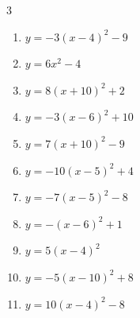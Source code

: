 \begin{multicols}{3}
\begin{enumerate}
  \item $\displaystyle y=-3\left( x-4\right)^{2}-9$

        \phantom{$\displaystyle 頂点\left( 4 , -9 \right)$}

\columnbreak %

\resetques

  \item $\displaystyle y=6x^{2}-4$

        \phantom{$\displaystyle 頂点\left( 0 , -4 \right)$}

  \item $\displaystyle y=8\left( x+10\right)^{2}+2$

        \phantom{$\displaystyle 頂点\left( -10 , 2 \right)$}

  \item $\displaystyle y=-3\left( x-6\right)^{2}+10$

        \phantom{$\displaystyle 頂点\left( 6 , 10 \right)$}

  \item $\displaystyle y=7\left( x+10\right)^{2}-9$

        \phantom{$\displaystyle 頂点\left( -10 , -9 \right)$}

  \item $\displaystyle y=-10\left( x-5\right)^{2}+4$

        \phantom{$\displaystyle 頂点\left( 5 , 4 \right)$}

  \item $\displaystyle y=-7\left( x-5\right)^{2}-8$

        \phantom{$\displaystyle 頂点\left( 5 , -8 \right)$}

  \item $\displaystyle y=-\left( x-6\right)^{2}+1$

        \phantom{$\displaystyle 頂点\left( 6 , 1 \right)$}

  \item $\displaystyle y=5\left( x-4\right)^{2}$

        \phantom{$\displaystyle 頂点\left( 4 , 0 \right)$}

  \item $\displaystyle y=-5\left( x-10\right)^{2}+8$

        \phantom{$\displaystyle 頂点\left( 10 , 8 \right)$}

  \item $\displaystyle y=10\left( x-4\right)^{2}-8$

        \phantom{$\displaystyle 頂点\left( 4 , -8 \right)$}


\end{enumerate}
\end{multicols}
